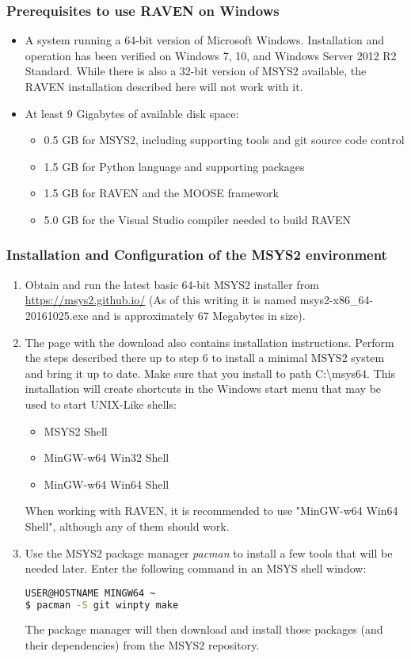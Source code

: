 \subsubsection{Prerequisites to use RAVEN on Windows}
\begin{itemize}
    \item A system running a 64-bit version of Microsoft Windows. Installation and operation
        has been verified on Windows 7, 10, and Windows Server 2012 R2 Standard. While there
        is also a 32-bit version of MSYS2 available, the RAVEN installation described here will not work with it.
    \item At least 9 Gigabytes of available disk space:
    \begin{itemize}
        \item 0.5 GB for MSYS2, including supporting tools and git source code control
        \item 1.5 GB for Python language and supporting packages
        \item 1.5 GB for RAVEN and the MOOSE framework
        \item 5.0 GB for the Visual Studio compiler needed to build RAVEN
    \end{itemize}
\end{itemize}

\subsubsection{Installation and Configuration of the MSYS2 environment}
\begin{enumerate}
    \item Obtain and run the latest basic 64-bit MSYS2 installer from \url{ https://msys2.github.io/} (As of this writing it is named
	msys2-x86\_64-20161025.exe and is approximately 67 Megabytes in size).
    \item The page with the download also contains installation instructions. Perform the steps described there up to
	step 6 to install a minimal MSYS2 system and bring it up to date. Make sure that you install to path 
        C:\textbackslash{}msys64.  This installation will create shortcuts in the Windows start menu that may be used 
        to start UNIX-Like shells:
		\begin{itemize}
	    		\item MSYS2 Shell
	    		\item MinGW-w64 Win32 Shell
	    		\item MinGW-w64 Win64 Shell
		\end{itemize}
        When working with RAVEN, it is recommended to use "MinGW-w64 Win64 Shell", although any of them should work.
    \item Use the MSYS2 package manager {\it pacman} to install a few tools that will be needed later.  Enter the following command in an MSYS shell window:

\begin{lstlisting}[language=bash]
USER@HOSTNAME MINGW64 ~
$ pacman -S git winpty make
\end{lstlisting}
	The package manager will then download and install those packages (and their dependencies) from the MSYS2 
	repository.
\end{enumerate}

